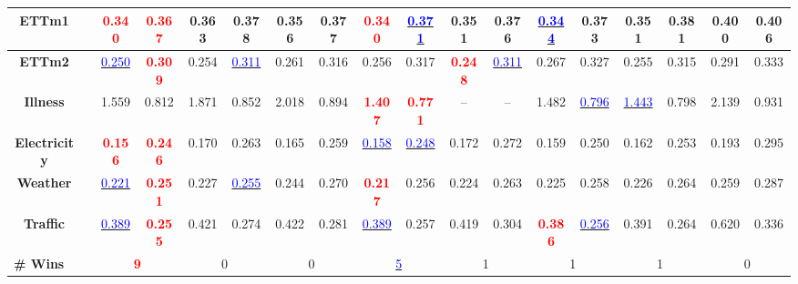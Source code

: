 \documentclass[10pt]{article}
\newcommand{\boldres}[1]{{\textbf{\textcolor{red}{#1}}}}
\newcommand{\secondres}[1]{{\underline{\textcolor{blue}{#1}}}}
\begin{document}
\begin{minipage}{7.1in}
{\begin{tabular}{cc|cc|cc|cc|cc|cc|cc|cc|cc}
\textbf{ETTm1} & &
\boldres{0.340} & \boldres{0.367} &
0.363 & 0.378 &
0.356 & 0.377 &
\boldres{0.340} & \secondres{0.371} &
0.351 & 0.376 &
\secondres{0.344} & 0.373 &
0.351 & 0.381 &
0.400 & 0.406 \\
\hline

\textbf{ETTm2} & &
\secondres{0.250} & \boldres{0.309} &
0.254 & \secondres{0.311} &
0.261 & 0.316 &
0.256 & 0.317 &
\boldres{0.248} & \secondres{0.311} &
0.267 & 0.327 &
0.255 & 0.315 &
0.291 & 0.333 \\
\hline

\textbf{Illness} & &
1.559 & 0.812 &
1.871 & 0.852 &
2.018 & 0.894 &
\boldres{1.407} & \boldres{0.771} &
-- & -- &
1.482 & \secondres{0.796} &
\secondres{1.443} & 0.798 &
2.139 & 0.931 \\
\hline

\textbf{Electricity} & &
\boldres{0.156} & \boldres{0.246} &
0.170 & 0.263 &
0.165 & 0.259 &
\secondres{0.158} & \secondres{0.248} &
0.172 & 0.272 &
0.159 & 0.250 &
0.162 & 0.253 &
0.193 & 0.295 \\
\hline

\textbf{Weather} & &
\secondres{0.221} & \boldres{0.251} &
0.227 & \secondres{0.255} &
0.244 & 0.270 &
\boldres{0.217} & 0.256 &
0.224 & 0.263 &
0.225 & 0.258 &
0.226 & 0.264 &
0.259 & 0.287 \\
\hline

\textbf{Traffic} & &
\secondres{0.389} & \boldres{0.255} &
0.421 & 0.274 &
0.422 & 0.281 &
\secondres{0.389} & 0.257 &
0.419 & 0.304 &
\boldres{0.386} & \secondres{0.256} &
0.391 & 0.264 &
0.620 & 0.336 \\
\bottomrule

\multicolumn{2}{l|}{\textbf{\# Wins}} &
\multicolumn{2}{c|}{\boldres{9}} &
\multicolumn{2}{c|}{0} &
\multicolumn{2}{c|}{0} &
\multicolumn{2}{c|}{\secondres{5}} &
\multicolumn{2}{c|}{1} &
\multicolumn{2}{c|}{1} &
\multicolumn{2}{c|}{1} &
\multicolumn{2}{c}{0} \\
\bottomrule
\end{tabular}}

\vspace{-2pt}

\end{minipage}\par\endgroup

\clearpage\begingroup

\setcounter{table}{1}
\end{document}

